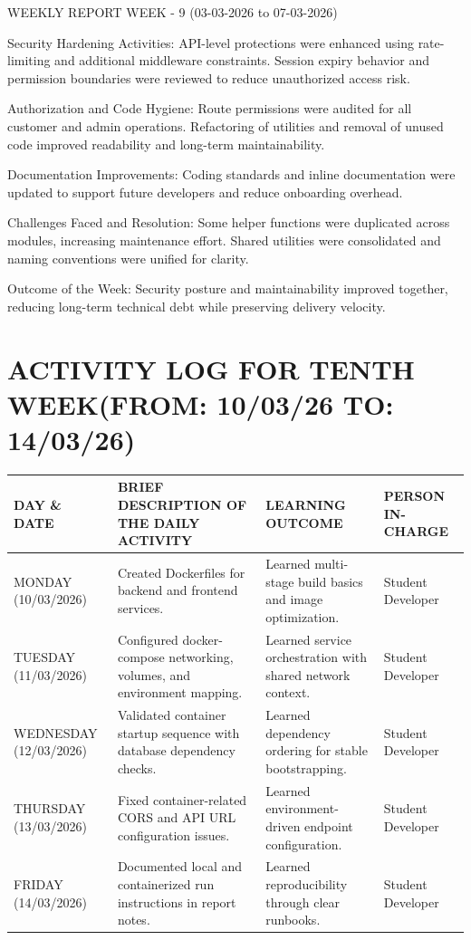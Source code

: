 \documentclass[12pt,a4paper]{report}
\begin{document}
WEEKLY REPORT
WEEK - 9 (03-03-2026 to 07-03-2026)

Security Hardening Activities:
API-level protections were enhanced using rate-limiting and additional middleware constraints. Session expiry behavior and permission boundaries were reviewed to reduce unauthorized access risk.

Authorization and Code Hygiene:
Route permissions were audited for all customer and admin operations. Refactoring of utilities and removal of unused code improved readability and long-term maintainability.

Documentation Improvements:
Coding standards and inline documentation were updated to support future developers and reduce onboarding overhead.

Challenges Faced and Resolution:
Some helper functions were duplicated across modules, increasing maintenance effort. Shared utilities were consolidated and naming conventions were unified for clarity.

Outcome of the Week:
Security posture and maintainability improved together, reducing long-term technical debt while preserving delivery velocity.

\section*{ACTIVITY LOG FOR TENTH WEEK(FROM: 10/03/26 TO: 14/03/26)}
\begin{longtable}{|p{2.2cm}|p{5.2cm}|p{4.3cm}|p{3.2cm}|}
\hline
\textbf{DAY \& DATE} & \textbf{BRIEF DESCRIPTION OF THE DAILY ACTIVITY} & \textbf{LEARNING OUTCOME} & \textbf{PERSON IN- CHARGE} \\
\hline
MONDAY (10/03/2026) & Created Dockerfiles for backend and frontend services. & Learned multi-stage build basics and image optimization. & Student Developer \\
\hline
TUESDAY (11/03/2026) & Configured docker-compose networking, volumes, and environment mapping. & Learned service orchestration with shared network context. & Student Developer \\
\hline
WEDNESDAY (12/03/2026) & Validated container startup sequence with database dependency checks. & Learned dependency ordering for stable bootstrapping. & Student Developer \\
\hline
THURSDAY (13/03/2026) & Fixed container-related CORS and API URL configuration issues. & Learned environment-driven endpoint configuration. & Student Developer \\
\hline
FRIDAY (14/03/2026) & Documented local and containerized run instructions in report notes. & Learned reproducibility through clear runbooks. & Student Developer \\
\hline
\end{longtable}
\end{document}
